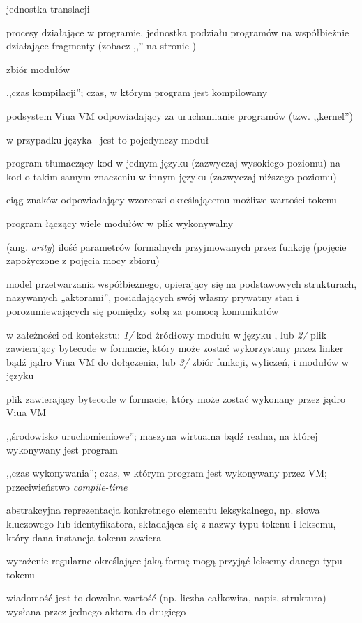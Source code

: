 \begin{labeling}{jednostka translacji}
    \item[aktory] procesy działające w programie, jednostka podziału programów
        na współbieżnie działające fragmenty (zobacz
        ,,'' na stronie \pageref{glossary_actors})
    \item[biblioteka] zbiór modułów
    \item[\emph{compile-time}] ,,czas kompilacji''; czas, w którym program jest kompilowany
    \item[jądro] podsystem Viua VM odpowiadający za uruchamianie programów (tzw. ,,kernel'')
    \item[jednostka translacji] w przypadku języka \ViuAct\ jest to pojedynczy moduł
    \item[kompilator] program tłumaczący kod w jednym języku (zazwyczaj wysokiego poziomu) na kod o takim
        samym znaczeniu w innym języku (zazwyczaj niższego poziomu)
    \item[leksem] ciąg znaków odpowiadający wzorcowi określającemu możliwe wartości tokenu
    \item[linker] program łączący wiele modułów w plik wykonywalny
    \item[moc funkcji] (ang. \emph{arity}) ilość parametrów formalnych przyjmowanych przez funkcję (pojęcie
        zapożyczone z pojęcia mocy zbioru)
    \item [model aktorów] model przetwarzania współbieżnego, opierający się na
        podstawowych strukturach, nazywanych „aktorami”, posiadających swój
        własny prywatny stan i porozumiewających się pomiędzy sobą za pomocą
        komunikatów
    \item[moduł] w załeżności od kontekstu: \emph{1/} kod źródłowy modułu w języku \ViuAct, lub \emph{2/} plik
        zawierający bytecode w formacie, który może zostać wykorzystany przez linker bądź jądro Viua VM do
        dołączenia, lub \emph{3/} zbiór funkcji, wyliczeń, i modułów w języku \ViuAct
    \item[plik wykonywalny] plik zawierający bytecode w formacie, który może zostać wykonany przez jądro Viua
        VM
    \item[runtime] ,,środowisko uruchomieniowe''; maszyna wirtualna bądź realna, na której
        wykonywany jest program
    \item[\emph{run-time}] ,,czas wykonywania''; czas, w którym program jest wykonywany przez VM;
        przeciwieństwo \emph{compile-time}
    \item[token] abstrakcyjna reprezentacja konkretnego elementu leksykalnego, np. słowa kluczowego lub
        identyfikatora, składająca się z nazwy typu tokenu i leksemu, który dana instancja tokenu zawiera
    \item[wzorzec] wyrażenie regularne określające jaką formę mogą przyjąć leksemy danego typu tokenu
	\item[wiadomość] wiadomość jest to dowolna wartość (np. liczba całkowita,
		napis, struktura) wysłana przez jednego aktora do drugiego
\end{labeling}

